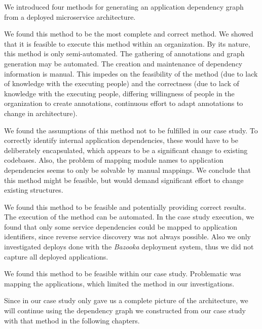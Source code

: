 We introduced four methods for generating an application dependency graph from a deployed microservice architecture.
\begin{tdescription}
  \item[\ncref{subsec:graph_manual_annotation}] We found this method to be the most complete and correct method. We showed that it is feasible to execute this method within an organization. By its nature, this method is only semi-automated. The gathering of annotations and graph generation may be automated. The creation and maintenance of dependency information is manual.
This impedes on the feasibility of the method (due to lack of knowledge with the executing people) and the correctness (due to lack of knowledge with the executing people, differing willingness of people in the organization to create annotations, continuous effort to adapt annotations to change in architecture).
  \item[\ncref{subsec:from_smi}] We found the assumptions of this method not to be fulfilled in our case study. To correctly identify internal application dependencies, these would have to be deliberately encapsulated, which appears to be a significant change to existing codebases. Also, the problem of mapping module names to application dependencies seems to only be solvable by manual mappings. We conclude that this method might be feasible, but would demand significant effort to change existing structures.
  \item[\ncref{subsec:graphfromdeploymentconf}] We found this method to be feasible and potentially providing correct results. The execution of the method can be automated. In the case study execution, we found that only some service dependencies could be mapped to application identifiers, since reverse service discovery was not always possible. Also we only investigated deploys done with the \emph{Bazooka} deployment system, thus we did not capture all deployed applications.
  \item[\ncref{subsec:from_network}] We found this method to be feasible within our case study. Problematic was mapping the applications, which limited the method in our investigations.
\end{tdescription}

Since in our case study only  gave us a complete picture of the architecture, we will continue using the dependency graph we constructed from our case study with that method in the following chapters.

